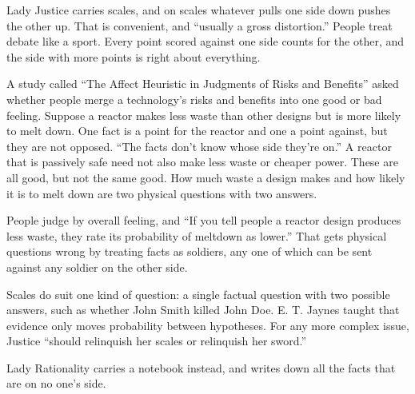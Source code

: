 
Lady Justice carries scales, and on scales whatever pulls one side down pushes the other up. That is convenient, and ``usually a gross distortion.'' People treat debate like a sport. Every point scored against one side counts for the other, and the side with more points is right about everything.

A study called ``The Affect Heuristic in Judgments of Risks and Benefits'' asked whether people merge a technology's risks and benefits into one good or bad feeling. Suppose a reactor makes less waste than other designs but is more likely to melt down. One fact is a point for the reactor and one a point against, but they are not opposed. ``The facts don't know whose side they're on.'' A reactor that is passively safe need not also make less waste or cheaper power. These are all good, but not the same good. How much waste a design makes and how likely it is to melt down are two physical questions with two answers.

People judge by overall feeling, and ``If you tell people a reactor design produces less waste, they rate its probability of meltdown as lower.'' That gets physical questions wrong by treating facts as soldiers, any one of which can be sent against any soldier on the other side. 

Scales do suit one kind of question: a single factual question with two possible answers, such as whether John Smith killed John Doe. E. T. Jaynes taught that evidence only moves probability between hypotheses.  For any more complex issue, Justice ``should relinquish her scales or relinquish her sword.'' 

Lady Rationality carries a notebook instead, and writes down all the facts that are on no one's side.

